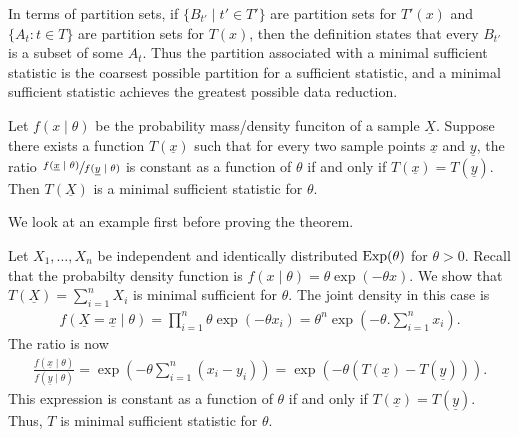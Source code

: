 In terms of partition sets, if $\{B_{t'} \mid t' \in T'\}$ are partition sets for $T'(x)$ and $\{A_{t}:t \in T\}$ are partition sets for $T(x)$, then the definition states that every $B_{t'}$ is a subset of some $A_{t}$. Thus the partition associated with a minimal sufficient statistic is the coarsest possible partition for a sufficient statistic, and a minimal sufficient statistic achieves the greatest possible data reduction.

\begin{theorem}
    Let $f(x \mid \theta)$ be the probability mass/density funciton of a sample $\underline{X}$. Suppose there exists a function $T(\underline{x})$ such that for every two sample points $\underline{x}$ and $\underline{y}$, the ratio $\sfrac{f(\underline{x}\mid \theta)}{f(\underline{y}\mid\theta)}$ is constant as a function of $\theta$ if and only if $T(\underline{x}) = T(\underline{y})$. Then $T(\underline{X})$ is a minimal sufficient statistic for $\theta$.
\end{theorem}

We look at an example first before proving the theorem.

\begin{example}
    Let $X_{1},\ldots,X_{n}$ be independent and identically distributed $\operatorname{Exp}(\theta)$ for $\theta > 0$. Recall that the probabilty density function is $f(x \mid \theta) = \theta \exp(-\theta x)$. We show that $T(\underline{X}) = \sum_{i=1}^{n} X_{i}$ is minimal sufficient for $\theta$. The joint density in this case is
    \begin{align}
        f(\underline{X}=\underline{x} \mid \theta) = \prod_{i=1}^{n} \theta \exp(-\theta x_{i}) = \theta^{n} \exp\left( -\theta .\sum_{i=1}^{n} x_{i} \right).
    \end{align}
    The ratio is now
    \begin{align}
        \frac{f(\underline{x} \mid \theta)}{f(\underline{y} \mid \theta)} = \exp\left( -\theta \sum_{i=1}^{n}(x_{i}-y_{i}) \right) = \exp(-\theta (T(\underline{x})-T(\underline{y}))).
    \end{align}
    This expression is constant as a function of $\theta$ if and only if $T(\underline{x}) = T(\underline{y})$. Thus, $T$ is minimal sufficient statistic for $\theta$.
\end{example}

